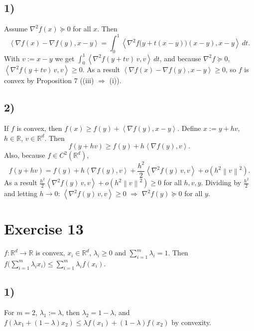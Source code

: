 \documentclass[11pt,a4paper]{article}
\newcommand{\R}{\mathbb{R}}
\newcommand{\norm}[1]{\left\| #1 \right\|}
\newcommand{\ip}[2]{\left\langle #1, #2 \right\rangle}
\begin{document}
\subsection*{1)}
Assume $\nabla^2 f(x) \succeq 0$ for all $x$. Then
\[
  \ip{\nabla f(x) - \nabla f(y)}{x-y}
  = \int_0^1 \ip{\nabla^2 f\bigl(y + t(x-y)\bigr)(x-y)}{x-y}\,dt .
\]
With $v := x - y$ we get $\int_0^1 \ip{\nabla^2 f(y + tv)\,v}{v}\,dt$, and because
$\nabla^2 f \succeq 0$, $\ip{\nabla^2 f(y + tv)\,v}{v} \ge 0$. As a result
$\ip{\nabla f(x) - \nabla f(y)}{x-y} \ge 0$, so $f$ is convex by Proposition 7
((iii) $\Rightarrow$ (i)).

\subsection*{2)}
If $f$ is convex, then $f(x) \ge f(y) + \ip{\nabla f(y)}{x-y}$. Define $x := y + hv$,
$h \in \R$, $v \in \R^d$. Then
\[
  f(y + hv) \ge f(y) + h\ip{\nabla f(y)}{v}.
\]
Also, because $f \in C^2(\R^d)$,
\[
  f(y + hv) = f(y) + h\ip{\nabla f(y)}{v} + \frac{h^2}{2}\ip{\nabla^2 f(y)\,v}{v} + o(h^2\norm{v}^2).
\]
As a result $\frac{h^2}{2}\ip{\nabla^2 f(y)\,v}{v} + o(h^2\norm{v}^2) \ge 0$ for all $h, v, y$.
Dividing by $\frac{h^2}{2}$ and letting $h \to 0$:
$\ip{\nabla^2 f(y)\,v}{v} \ge 0$ $\Rightarrow$ $\nabla^2 f(y) \succeq 0$ for all $y$.

\section*{Exercise 13}

$f : \R^d \to \R$ is convex, $x_i \in \R^d$, $\lambda_i \ge 0$ and $\sum_{i=1}^m \lambda_i = 1$.
Then $f\bigl(\sum_{i=1}^m \lambda_i x_i\bigr) \le \sum_{i=1}^m \lambda_i f(x_i)$.

\subsection*{1)}
For $m = 2$, $\lambda_1 := \lambda$, then $\lambda_2 = 1 - \lambda$, and
$f(\lambda x_1 + (1-\lambda)x_2) \le \lambda f(x_1) + (1-\lambda) f(x_2)$ by convexity.
\end{document}
